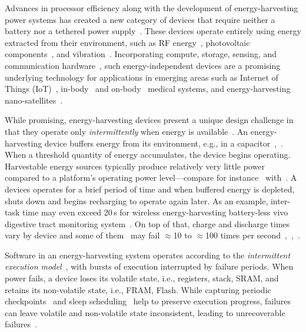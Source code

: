 Advances in processor efficiency along with the development of energy-harvesting power systems has created a new category of devices that require neither a battery nor a tethered power supply~\cite{prasad_comst_2014,lucia_snapl_2017,soyata_csm_2016}. These devices operate entirely using energy extracted from their environment, such as RF energy~\cite{rf_powered_computing_gollakota_2014}, photovoltaic components~\cite{margolies_infocom_2016,margolies_tosn_2016}, and vibration~\cite{gorlatova_sigmetrics_2014}. Incorporating compute, storage, sensing, and communication hardware~\cite{wisp5,moo}, such energy-independent devices are a promising underlying technology for applications in emerging areas such as Internet of Things (IoT)~\cite{ku_cst_2016}, in-body~\cite{nadeau_naturebio_2017} and on-body~\cite{bandodkar_electroanalysis_2015} medical systems, and energy-harvesting nano-satellites~\cite{kicksat}.

While promising, energy-harvesting devices present a unique design challenge in that they operate only {\em intermittently} when energy is available~\cite{hicks_isca_2017,lucia_snapl_2017}. An
energy-harvesting device buffers energy from its environment, e.g., in a capacitor~\cite[Fig. 3]{gorlatova_tmc_2013},~\cite[Fig. 1]{gunduz_commag_2014}. When a threshold quantity of energy accumulates, the device begins operating. Harvestable energy sources typically produce relatively very little power compared to a platform's operating power level---compare for instance~\cite[Table III and V]{prasad_comst_2014} with~\cite[Table I]{carrano_cst_2014}. A devices operates for a brief period of time and when buffered energy is depleted, shuts down and begins recharging to operate again later. As an example, inter-task time may even exceed 20\,s for wireless energy-harvesting battery-less vivo digestive tract monitoring system~\cite[Fig. 3c]{nadeau_naturebio_2017}. On top of that, charge and discharge times vary by device and some of them~\cite{wisp} may fail $\approx$10 to $\approx$100 times per second~\cite[Fig. 1]{tan_infocom_2016},~\cite[Fig. 1]{mementos},~\cite[Fig. 3]{nvp}.

Software in an energy-harvesting system operates according to the {\em intermittent execution model}~\cite{dino,lucia_snapl_2017}, with bursts of execution interrupted by failure periods. When power fails, a device loses its volatile state, i.e., registers, stack, SRAM, and retains its non-volatile state, i.e., FRAM, Flash. While capturing periodic checkpoints~\cite{mementos,quickrecall} and sleep scheduling~\cite{dewdrop,hibernus,hibernusplusplus} help to preserve execution progress, failures can leave volatile and non-volatile state inconsistent, leading to unrecoverable failures~\cite{mspcdino,edb}. 

